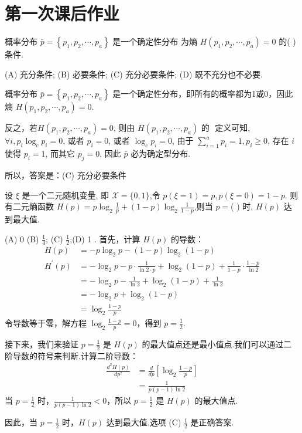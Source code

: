 \newpage
\section{第一次课后作业}

\begin{tcolorbox}[breakable,colback=blue!5!white,colframe=blue!75!black,
 title= 单选题]
  概率分布 $ \bar{p}=\left\{p_{1}, p_{2}, \cdots, p_{a}\right\} $ 是一个确定性分布 为熵 $ H\left(p_{1}, p_{2}, \cdots, p_{a}\right)=0 $ 的(  ) 条件.

    
(A) 充分条件;
(B) 必要条件;
(C) 充分必要条件;
(D) 既不充分也不必要.
 \tcblower

概率分布 $\bar{p}=\left\{p_{1}, p_{2}, \cdots, p_{a}\right\}$ 是一个确定性分布，即所有的概率都为1或0，因此熵 $H\left(p_{1}, p_{2}, \cdots, p_{a}\right)=0$.

反之，若$H\left(p_{1}, p_{2}, \cdots, p_{a}\right)=0 \text {, 则由 } H\left(p_{1}, p_{2}, \cdots, p_{a}\right) \text { 的 }
$
定义可知, $ \forall i, p_{i} \log _{c} p_{i}=0 $, 或者 $ p_{i}=0 $, 或者 $ \log _{c} p_{i}=0 $, 由于 $ \sum\limits_{i=1}^{a} p_{i}=1, p_{i} \geq 0 $, 存在 $ i $ 使得 $ p_{i}=1 $, 而其它 $ p_{j}=0 $, 因此 $ \bar{p} $ 必为确定型分布.

所以，答案是：(C) 充分必要条件


\end{tcolorbox}


\begin{tcolorbox}[breakable,colback=blue!5!white,colframe=blue!75!black,
 title= 单选题]
 设 $ \xi $ 是一个二元随机变量, 即 $ \mathscr{X}=\{0,1\} $,令 $ p(\xi=1)=p, p(\xi=0)=1-p $. 则有二元熵函数 $ H(p)=p \log _{2} \frac{1}{p}+(1-p) \log _{2} \frac{1}{1-p} $,则当 $ p=$(  ) 时, $ H(p) $ 达到最大值.

(A) $ 0  $ (B) $ \frac{1}{4} $;
(C) $ \frac{1}{2} $;(D) 1 .
  \tcblower
  首先，计算 $ H(p) $ 的导数：
$$
\begin{aligned}
H(p) & =-p \log_2 p-(1-p) \log_2 (1-p) \\
H^{\prime}(p) & =-\log_2 p-p \cdot \frac{1}{\ln 2 \cdot p}+\log_2 (1-p)+\frac{1}{1-p} \cdot \frac{1-p}{\ln 2} \\
& =-\log_2 p-\frac{1}{\ln 2}+\log_2 (1-p)+\frac{1}{\ln 2} \\
& =-\log_2 p+\log_2 (1-p) \\
& =\log_2 \frac{1-p}{p}
\end{aligned}
$$
令导数等于零，解方程 $ \log _{2} \frac{1-p}{p}=0 $，得到 $ p=\frac{1}{2} $.

接下来，我们来验证 $ p=\frac{1}{2} $ 是 $ H(p) $ 的最大值点还是最小值点.我们可以通过二阶导数的符号来判断.计算二阶导数：
$$
\begin{aligned}
\frac{d^{2} H(p)}{d p^{2}} &=\frac{d}{d p}\left[\log _{2} \frac{1-p}{p}\right] \\
&=\frac{1}{p(p-1)\ln 2}
\end{aligned}
$$
当 $ p=\frac{1}{2} $ 时，$ \frac{1}{p(p-1)\ln 2}<0 $，所以 $ p=\frac{1}{2} $ 是 $ H(p) $ 的最大值点.

因此，当 $ p=\frac{1}{2} $ 时，$ H(p) $ 达到最大值.选项 (C) $ \frac{1}{2} $ 是正确答案.
\end{tcolorbox}

